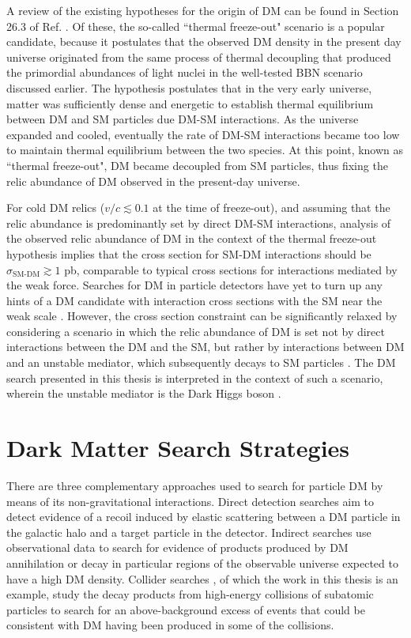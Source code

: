 A review of the existing hypotheses for the origin of DM can be found in Section 26.3 of Ref. \cite{pdg_2018}. Of these, the so-called ``thermal freeze-out" scenario is a popular candidate, because it postulates that the observed DM density in the present day universe originated from the same process of thermal decoupling that produced the primordial abundances of light nuclei in the well-tested BBN scenario discussed earlier. The hypothesis postulates that in the very early universe, matter was sufficiently dense and energetic to establish thermal equilibrium between DM and SM particles due DM-SM interactions. As the universe expanded and cooled, eventually the rate of DM-SM interactions became too low to maintain thermal equilibrium between the two species. At this point, known as ``thermal freeze-out", DM became decoupled from SM particles, thus fixing the relic abundance of DM observed in the present-day universe. 

For cold DM relics (\(v/c\lesssim0.1\) at the time of freeze-out), and assuming that the relic abundance is predominantly set by direct DM-SM interactions, analysis of the observed relic abundance of DM in the context of the thermal freeze-out hypothesis \cite{dm_xsec_2015} implies that the cross section for SM-DM interactions should be \(\sigma_\text{SM-DM}\gtrsim1\) pb, comparable to typical cross sections for interactions mediated by the weak force. Searches for DM in particle detectors have yet to turn up any hints of a DM candidate with interaction cross sections with the SM near the weak scale \cite{wimp_searches_2018}. However, the cross section constraint can be significantly relaxed by considering a scenario in which the relic abundance of DM is set not by direct interactions between the DM and the SM, but rather by interactions between DM and an unstable mediator, which subsequently decays to SM particles \cite{secluded_dm_2008}. The DM search presented in this thesis is interpreted in the context of such a scenario, wherein the unstable mediator is the Dark Higgs boson \cite{Duerr_2016,Duerr2017}.

\section{Dark Matter Search Strategies}

There are three complementary approaches used to search for particle DM by means of its non-gravitational interactions. Direct detection searches \cite{billard2021direct} aim to detect evidence of a recoil induced by elastic scattering between a DM particle in the galactic halo and a target particle in the detector. Indirect searches \cite{CIRELLI_2012, conrad} use observational data to search for evidence of products produced by DM annihilation or decay in particular regions of the observable universe expected to have a high DM density. Collider searches \cite{DM_colliders}, of which the work in this thesis is an example, study the decay products from high-energy collisions of subatomic particles to search for an above-background excess of events that could be consistent with DM having been produced in some of the collisions.

